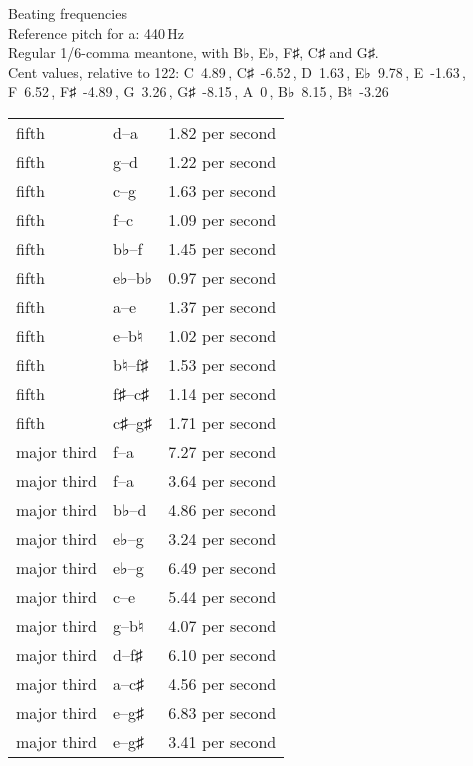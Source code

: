 \documentclass{standalone}
\def\str{\textquotesingle}
\def\cn{\textcent}
\begin{document}
\begin{minipage}{8cm}
\begin{center}
  {\Large Beating frequencies}\\[2ex]
  Reference pitch for a\str: 440\,Hz\\[1ex]
  Regular 1/6-comma meantone, with B♭, E♭, F♯, C♯ and G♯.\\[1ex]
  Cent values, relative to 122: C~4.89\,\cn, C♯~-6.52\,\cn, D~1.63\,\cn, E♭~9.78\,\cn, E~-1.63\,\cn, F~6.52\,\cn, F♯~-4.89\,\cn, G~3.26\,\cn, G♯~-8.15\,\cn, A~0\,\cn, B♭~8.15\,\cn, B♮~-3.26\,\cn
\end{center}
\begin{longtable}{p{2cm}p{1cm}p{3cm}}
  \toprule
  fifth & d\str--a\str & 1.82 per second \\fifth & g--d\str & 1.22 per second \\fifth & c\str--g\str & 1.63 per second \\fifth & f--c\str & 1.09 per second \\fifth & b♭--f\str & 1.45 per second \\fifth & e♭--b♭ & 0.97 per second \\fifth & a--e\str & 1.37 per second \\fifth & e--b♮ & 1.02 per second \\fifth & b♮--f♯\str & 1.53 per second \\fifth & f♯--c♯\str & 1.14 per second \\fifth & c♯\str--g♯\str & 1.71 per second \\major third & f\str--a\str & 7.27 per second \\major third & f--a & 3.64 per second \\major third & b♭--d\str & 4.86 per second \\major third & e♭--g & 3.24 per second \\major third & e♭\str--g\str & 6.49 per second \\major third & c\str--e\str & 5.44 per second \\major third & g--b♮ & 4.07 per second \\major third & d\str--f♯\str & 6.10 per second \\major third & a--c♯\str & 4.56 per second \\major third & e\str--g♯\str & 6.83 per second \\major third & e--g♯ & 3.41 per second \\
  \bottomrule
\end{longtable}
\end{minipage}
\end{document}
